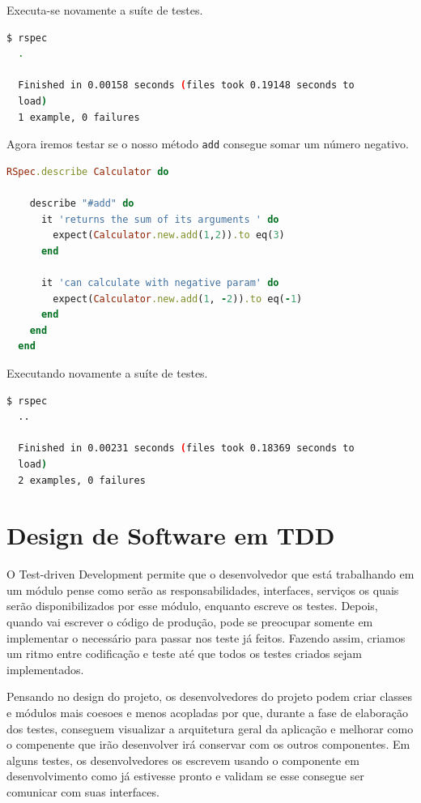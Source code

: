 \documentclass[12pt]{article}
\newcommand{\code}[1]{\texttt{#1}}
\begin{document}
  Executa-se novamente a suíte de testes.

  \begin{lstlisting}[language=bash]
  $ rspec
  .

  Finished in 0.00158 seconds (files took 0.19148 seconds to 
  load)
  1 example, 0 failures
  \end{lstlisting}

  Agora iremos testar se o nosso método \code{add} consegue somar um número
  negativo.

  \begin{lstlisting}[language=Ruby]
  RSpec.describe Calculator do

    describe "#add" do
      it 'returns the sum of its arguments ' do
        expect(Calculator.new.add(1,2)).to eq(3)
      end

      it 'can calculate with negative param' do
        expect(Calculator.new.add(1, -2)).to eq(-1)
      end
    end
  end
  \end{lstlisting}

  Executando novamente a suíte de testes.

  \begin{lstlisting}[language=bash]
  $ rspec
  ..

  Finished in 0.00231 seconds (files took 0.18369 seconds to 
  load)
  2 examples, 0 failures
  \end{lstlisting}

  \section{Design de Software em TDD}

  O Test-driven Development permite que o desenvolvedor que está trabalhando 
  em um módulo pense como serão as responsabilidades, interfaces, serviços os 
  quais serão disponibilizados por esse módulo, enquanto escreve os testes. 
  Depois, quando vai escrever o código de produção, pode se preocupar somente em
  implementar o necessário para passar nos teste já feitos. Fazendo assim, 
  criamos um ritmo entre codificação e teste até que todos os testes criados 
  sejam implementados.

  Pensando no design do projeto, os desenvolvedores do projeto podem criar
  classes e módulos mais coesoes e menos acopladas por que, durante a fase de 
  elaboração dos testes, conseguem visualizar a arquitetura geral da aplicação e
  melhorar como o compenente que irão desenvolver irá conservar com os outros 
  componentes. Em alguns testes, os desenvolvedores os escrevem usando o 
  componente em desenvolvimento como já estivesse pronto e validam se
  esse consegue ser comunicar com suas interfaces.
\end{document}
